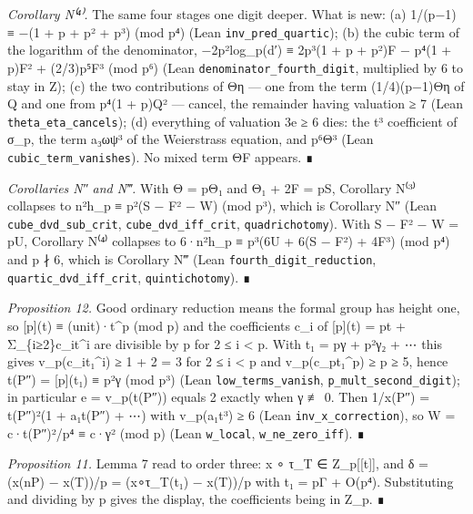 \documentclass[11pt,a4paper]{article}
\theoremstyle{named}
\begin{document}
\textit{Corollary N⁽⁴⁾.} The same four stages one digit deeper. What is new: (a) 1/(p−1) ≡ −(1 + p + p² + p³) (mod p⁴) (Lean \texttt{inv\_\allowbreak{}pred\_\allowbreak{}quartic}); (b) the cubic term of the logarithm of the denominator, −2p²log\_p(d′) ≡ 2p³(1 + p + p²)F − p⁴(1 + p)F² + (2/3)p⁵F³ (mod p⁶) (Lean \texttt{denominator\_\allowbreak{}fourth\_\allowbreak{}digit}, multiplied by 6 to stay in Z); (c) the two contributions of Θη — one from the term (1/4)(p−1)Θη of Q and one from p⁴(1 + p)Q² — cancel, the remainder having valuation ≥ 7 (Lean \texttt{theta\_\allowbreak{}eta\_\allowbreak{}cancels}); (d) everything of valuation 3e ≥ 6 dies: the t³ coefficient of σ\_p, the term a₃ωψ³ of the Weierstrass equation, and p⁶Θ³ (Lean \texttt{cubic\_\allowbreak{}term\_\allowbreak{}vanishes}). No mixed term ΘF appears. ∎

\textit{Corollaries N″ and N‴.} With Θ = pΘ₁ and Θ₁ + 2F = pS, Corollary N⁽³⁾ collapses to n²h\_p ≡ p²(S − F² − W) (mod p³), which is Corollary N″ (Lean \texttt{cube\_\allowbreak{}dvd\_\allowbreak{}sub\_\allowbreak{}crit}, \texttt{cube\_\allowbreak{}dvd\_\allowbreak{}iff\_\allowbreak{}crit}, \texttt{quadrichotomy}). With S − F² − W = pU, Corollary N⁽⁴⁾ collapses to 6·n²h\_p ≡ p³(6U + 6(S − F²) + 4F³) (mod p⁴) and p ∤ 6, which is Corollary N‴ (Lean \texttt{fourth\_\allowbreak{}digit\_\allowbreak{}reduction}, \texttt{quartic\_\allowbreak{}dvd\_\allowbreak{}iff\_\allowbreak{}crit}, \texttt{quintichotomy}). ∎

\textit{Proposition 12.} Good ordinary reduction means the formal group has height one, so [p](t) ≡ (unit)·t\textasciicircum{}p (mod p) and the coefficients c\_i of [p](t) = pt + Σ\_\{i≥2\}c\_it\textasciicircum{}i are divisible by p for 2 ≤ i \textless{} p. With t₁ = pγ + p²γ₂ + ⋯ this gives v\_p(c\_it₁\textasciicircum{}i) ≥ 1 + 2 = 3 for 2 ≤ i \textless{} p and v\_p(c\_pt₁\textasciicircum{}p) ≥ p ≥ 5, hence t(P″) = [p](t₁) ≡ p²γ (mod p³) (Lean \texttt{low\_\allowbreak{}terms\_\allowbreak{}vanish}, \texttt{p\_\allowbreak{}mult\_\allowbreak{}second\_\allowbreak{}digit}); in particular e = v\_p(t(P″)) equals 2 exactly when γ ≢ 0. Then 1/x(P″) = t(P″)²(1 + a₁t(P″) + ⋯) with v\_p(a₁t³) ≥ 6 (Lean \texttt{inv\_\allowbreak{}x\_\allowbreak{}correction}), so W = c·t(P″)²/p⁴ ≡ c·γ² (mod p) (Lean \texttt{w\_\allowbreak{}local}, \texttt{w\_\allowbreak{}ne\_\allowbreak{}zero\_\allowbreak{}iff}). ∎

\textit{Proposition 11.} Lemma 7 read to order three: x ∘ τ\_T ∈ Z\_p[[t]], and δ = (x(nP) − x(T))/p = (x∘τ\_T(t₁) − x(T))/p with t₁ = pΓ + O(p⁴). Substituting and dividing by p gives the display, the coefficients being in Z\_p. ∎
\end{document}
